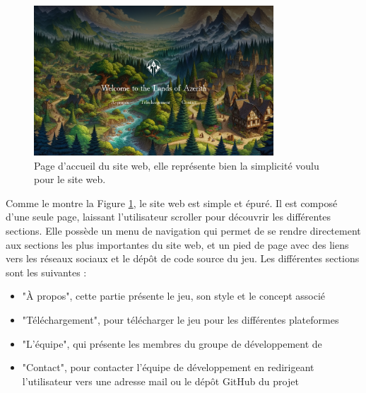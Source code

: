 \begin{figure}[H]
    \centering
    \includegraphics[width=0.8\textwidth]{assets/website1.png}
    \caption{Page d'accueil du site web, elle représente bien la simplicité voulu pour le site web.}
    \label{fig:website1}
\end{figure}

Comme le montre la Figure \ref*{fig:website1}, le site web est simple et épuré.
Il est composé d'une seule page, laissant l'utilisateur scroller pour découvrir les différentes sections.
Elle possède un menu de navigation qui permet de se rendre directement aux sections les plus importantes du site web, et un pied de page avec des liens vers les réseaux sociaux et le dépôt de code source du jeu.
Les différentes sections sont les suivantes :
\\

\begin{itemize}

    \item "À propos", cette partie présente le jeu, son style et le concept associé
          \\

    \item "Téléchargement", pour télécharger le jeu pour les différentes plateformes
          \\

    \item "L'équipe", qui présente les membres du groupe de développement de \gameName
          \\

    \item "Contact", pour contacter l'équipe de développement en redirigeant l'utilisateur vers une adresse mail ou le dépôt GitHub du projet

\end{itemize}

